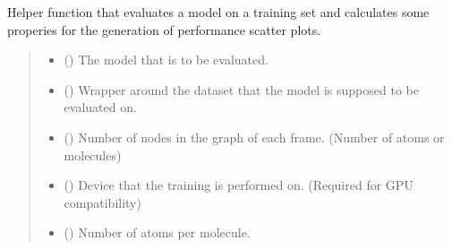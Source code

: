 \documentclass[a4paper,10pt,english]{report}
\begin{document}
\begin{fulllineitems}
\label{\detokenize{NNucleate:NNucleate.training.evaluate_model_gnn}}
\pysigstartsignatures
{}
\pysigstopsignatures
\sphinxAtStartPar
Helper function that evaluates a model on a training set and calculates some properies for the generation of performance scatter plots.
\begin{quote}\begin{description}
\begin{itemize}
\item {} 
\sphinxAtStartPar
{} ({\hyperref[\detokenize{NNucleate:NNucleate.models.GNNCV}]{}}) \textendash{} The model that is to be evaluated.

\item {} 
\sphinxAtStartPar
{} () \textendash{} Wrapper around the dataset that the model is supposed to be evaluated on.

\item {} 
\sphinxAtStartPar
{} () \textendash{} Number of nodes in the graph of each frame. (Number of atoms or molecules)

\item {} 
\sphinxAtStartPar
{} () \textendash{} Device that the training is performed on. (Required for GPU compatibility)

\item {} 
\sphinxAtStartPar
{} (\sphinxstyleliteralemphasis{\sphinxupquote{, }}) \textendash{} Number of atoms per molecule.


\end{itemize}
\end{description}
\end{quote}
\end{fulllineitems}
\end{document}
